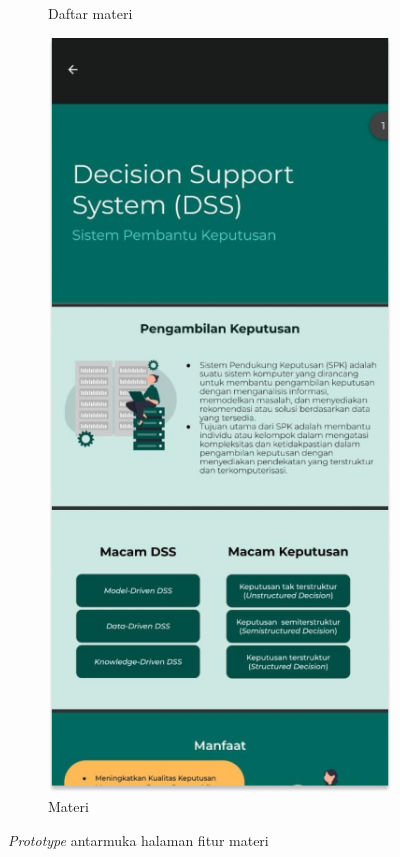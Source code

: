 \begin{figure}[H]
\begin{subfigure}[b]{0.23\textwidth}
	  \caption{Daftar materi}
	  \label{fig:HasilMain4-dark}
	\end{subfigure}
    \begin{subfigure}[b]{0.23\textwidth}
		\centering
	  \includegraphics[width=\linewidth]{contents/chapter-3/images/HF-materi2-dt.png}
	  \caption{Materi}
	  \label{fig:HasilMain4}
	\end{subfigure}
	\caption{\textit{Prototype} antarmuka halaman fitur materi}
	\label{Fig:HasilFeatureSetDrawer}
\end{figure}
